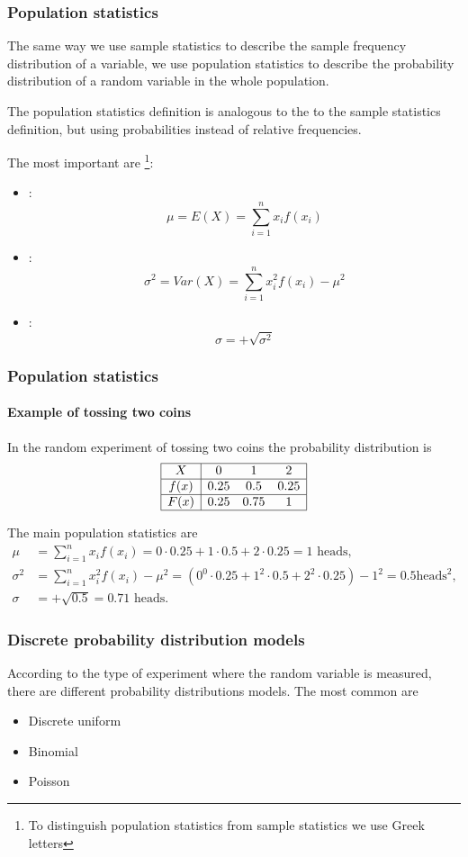 \begin{frame}
\frametitle{Population statistics}
The same way we use sample statistics to describe the sample frequency distribution of a variable, we use
population statistics to describe the probability distribution of a random variable in the whole population.

The population statistics definition is analogous to the to the sample statistics definition, but using probabilities
instead of relative frequencies. 

The most important are \footnote{To distinguish population statistics from sample statistics we use Greek letters}:
\begin{itemize}
\item {}:
\[
\mu = E(X) = \sum_{i=1}^n x_i f(x_i)
\]
\item {}:
\[
\sigma^2 = Var(X) = \sum_{i=1}^n x_i^2 f(x_i) -\mu^2
\]
\item {}:
\[
\sigma = +\sqrt{\sigma^2}
\]
\end{itemize}
\end{frame}


\begin{frame}
\frametitle{Population statistics}
\framesubtitle{Example of tossing two coins}
In the random experiment of tossing two coins the probability distribution is  
\[
\begin{array}{|c|ccc|}
\hline
X & 0 & 1 & 2\\ \hline
f(x) & 0.25 & 0.5 & 0.25\\
\hline
F(x) & 0.25 & 0.75 & 1 \\
\hline
\end{array}
\]

The main population statistics are 
\begin{align*}
\mu &= \sum_{i=1}^n x_i f(x_i) = 0\cdot 0.25 + 1\cdot 0.5 + 2\cdot 0.25 = 1 \mbox{ heads},\\
\sigma^2 &= \sum_{i=1}^n x_i^2 f(x_i) -\mu^2 = (0^0\cdot 0.25 + 1^2\cdot 0.5 + 2^2\cdot 0.25) - 1^2 = 0.5 \mbox{
heads}^2,\\
\sigma &= +\sqrt{0.5} = 0.71 \mbox{ heads}.
\end{align*}
\end{frame}


\begin{frame}
\frametitle{Discrete probability distribution models}
According to the type of experiment where the random variable is measured, there are different probability distributions
models. 
The most common are

\begin{itemize}
\item Discrete uniform
\item Binomial
\item Poisson 
\end{itemize}
\end{frame}


